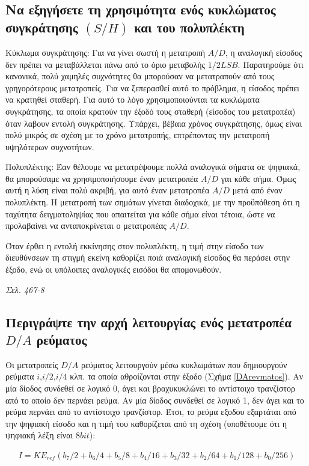 \documentclass{article}
\begin{document}
\subsection{Να εξηγήσετε τη χρησιμότητα ενός κυκλώματος συγκράτησης $(S/H)$ και του πολυπλέκτη}
Κύκλωμα συγκράτησης: Για να γίνει σωστή η μετατροπή $Α/D$, η αναλογική είσοδος δεν πρέπει να μεταβάλλεται πάνω από το όριο μεταβολής $1/2LSB$. Παρατηρούμε ότι κανονικά,
πολύ χαμηλές συχνότητες θα μπορούσαν να μετατραπούν από τους γρηγορότερους μετατροπείς. Για να ξεπερασθεί αυτό το πρόβλημα, η είσοδος πρέπει να κρατηθεί σταθερή. Για
αυτό το λόγο χρησιμοποιούνται τα κυκλώματα συγκράτησης, τα οποία κρατούν την έξοδό τους σταθερή (είσοδος του μετατροπέα) όταν λαβουν εντολή συγκράτησης. Υπάρχει, 
βέβαια χρόνος συγκράτησης, όμως είναι πολύ μικρός σε σχέση με το χρόνο μετατροπής, επτρέποντας την μετατροπή υψηλότερων συχνοτήτων.

Πολυπλέκτης: Έαν θέλουμε να μετατρέψουμε πολλά αναλογικά σήματα σε ψηφιακά, θα μπορούσαμε να χρησιμοποιήσουμε έναν μετατροπέα $A/D$ γαι κάθε σήμα. Όμως αυτή η λύση είναι
πολύ ακριβή, για αυτό έναν μετατροπέα $A/D$ μετά από έναν πολυπλέκτη. Η μετατροπή των σημάτων γίνεται διαδοχικά, με την προϋπόθεση ότι η ταχύτητα δειγματοληψίας που
απαιτείται για κάθε σήμα είναι τέτοια, ώστε να προλαβαίνει να ανταποκρίνεται ο μετατροπέας $Α/D$.

Όταν έρθει η εντολή εκκίνησης στον πολυπλέκτη, η τιμή στην είσοδο των διευθύνσεων τη στιγμή εκείνη καθορίζει ποιά αναλογική είσοδος θα περάσει στην έξοδο, ενώ οι 
υπόλοιπες αναλογικές εισόδοι θα απομονωθούν.

\emph{Σελ. 467-8}

\subsection{Περιγράψτε την αρχή λειτουργίας ενός μετατροπέα $D/A$ ρεύματος}
Οι μετατροπείς $D/A$ ρεύματος λειτουργούν μέσω κυκλωμάτων που δημιουργούν ρεύματα $i$,$i/2$,$i/4$ κλπ. τα οποία αθροίζονται στην έξοδο (Σχήμα \ref{DArevmatos}). Αν μία δίοδος συνδεθεί σε λογικό 0, άγει και 
βραχυκυκλώνει το αντίστοιχο τρανζίστορ από το οποίο δεν περνάει ρεύμα. Αν μία δίοδος συνδεθεί σε λογικό 1, δεν άγει και το ρεύμα περνάει από το αντίστοιχο τρανζίστορ. Έτσι, το 
ρεύμα εξοδου εξαρτάται από την ψηφιακή είσοδο και η τιμή του καθορίζεται από τη σχέση (υποθέτουμε ότι η ψηφιακή λέξη είναι $8 bit$):

\begin{align*}
    I = K E_{ref} \left( b_7/2 + b_6/4 + b_5/8 + b_4/16 +b_3/32 + b_2/64 + b_1/128 + b_0/256 \right)
\end{align*}
\end{document}

